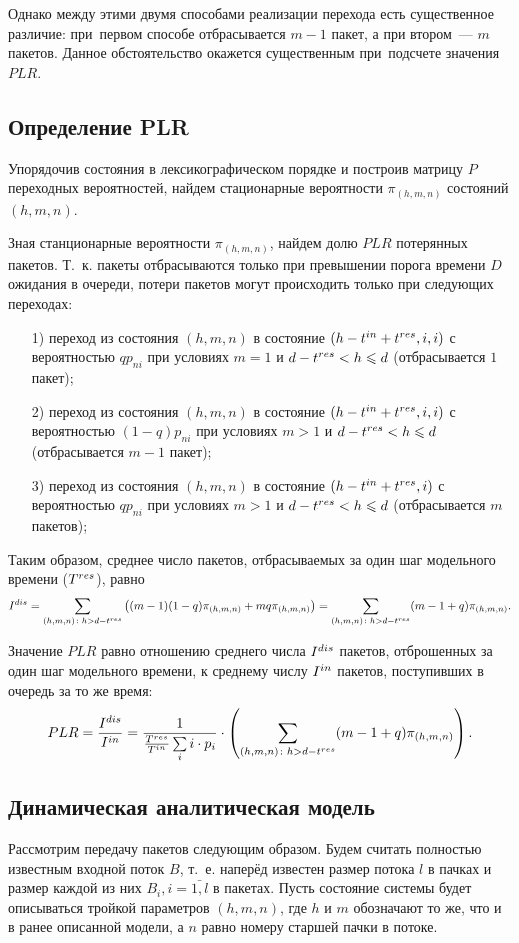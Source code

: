 Однако между этими двумя способами реализации перехода есть существенное различие: при~первом способе отбрасывается $m - 1$ пакет, а при втором~--- $m$ пакетов. Данное обстоятельство окажется существенным при~подсчете значения $PLR$.  

\subsection{Определение PLR}
Упорядочив состояния в лексикографическом порядке и построив матрицу $P$ переходных вероятностей, найдем стационарные вероятности $\pi_{(h,m,n)}$ состояний $(h,m,n)$.

Зная станционарные вероятности $\pi_{(h,m, n)}$, найдем долю $PLR$ потерянных пакетов. Т.~к. пакеты отбрасываются только при превышении порога времени $D$ ожидания в очереди, потери пакетов могут происходить только при следующих переходах:
\begin{itemize}
\item[1)]переход из состояния $(h, m, n)$ в состояние \mbox{$(h - t^{in} + t^{res}, i, i)$} с вероятностью $q p_{ni}$ при условиях $m = 1$ и $d - t^{res} < h \leqslant d$ (отбрасывается $1$ пакет);
\item[2)]переход из состояния $(h, m, n)$ в состояние \mbox{$(h - t^{in} + t^{res}, i, i)$} с вероятностью $(1 - q)p_{ni}$ при условиях $m > 1$ и $d - t^{res} < h \leqslant d$ (отбрасывается $m - 1$ пакет); 
\item[3)]переход из состояния $(h, m, n)$ в состояние \mbox{$(h - t^{in} + t^{res}, i)$} с вероятностью $q p_{ni}$ при условиях $m > 1$ и $d - t^{res} < h \leqslant d$ (отбрасывается $m$ пакетов);
\end{itemize}

Таким образом, среднее число пакетов, отбрасываемых за один шаг модельного времени ($T^{res}$), равно
$$
	I^{dis} = \sum\limits_{(h,m, n)\colon h > d - t^{res}} \left((m - 1)(1 - q)\pi_{(h,m,n)} + mq\pi_{(h,m,n)}\right) = 
	\sum\limits_{(h,m,n)\colon h > d - t^{res}} (m - 1 + q)\pi_{(h,m,n)}.
$$

Значение $PLR$ равно отношению среднего числа $I^{dis}$ пакетов, отброшенных за один шаг модельного времени, к среднему числу $I^{in}$ пакетов, поступивших в очередь за то же время:
$$
PLR = \frac{I^{dis}}{I^{in}} = \frac{1}{\frac{T^{res}}{T^{in}} \sum\limits_{i} i\cdot p_i} \cdot \left(\sum\limits_{(h,m,n)\colon h > d - t^{res}} (m - 1 + q)\pi_{(h,m,n)} \right).
$$

\subsection{Динамическая аналитическая модель} %
\label{DynamicModel}
Рассмотрим передачу пакетов следующим образом. Будем считать полностью известным входной поток $B$, т.~е. наперёд известен размер потока $l$ в пачках и размер каждой из них $B_i, i=\bar{1, l}$ в пакетах. Пусть состояние системы будет описываться тройкой параметров $(h,m,n)$, где $h$ и $m$ обозначают то же, что и в ранее описанной модели, а $n$ равно номеру старшей пачки в потоке.

